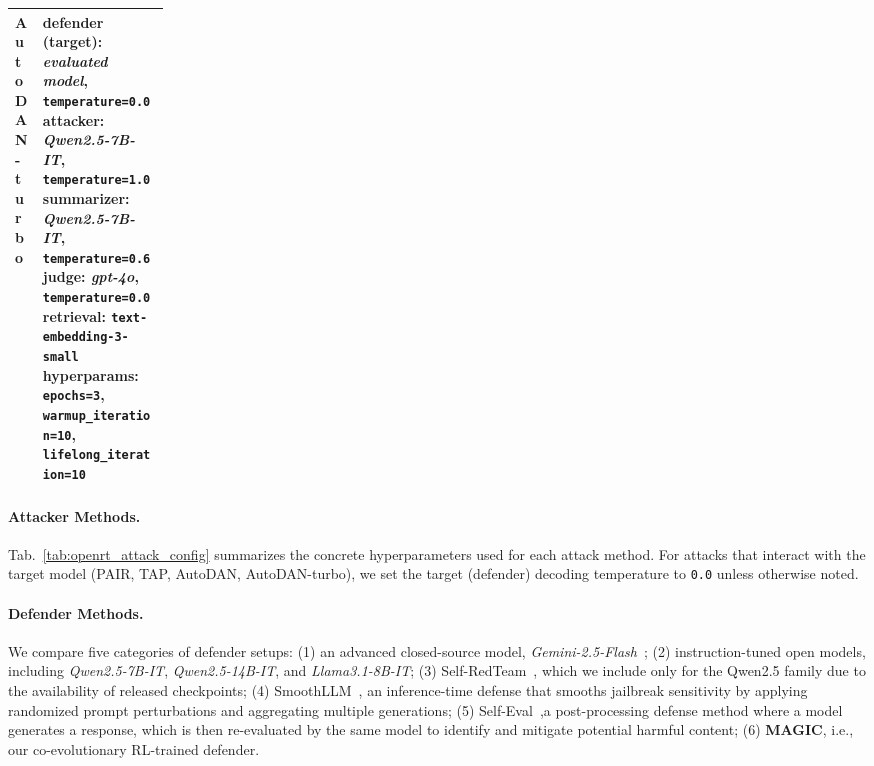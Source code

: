 \documentclass[11pt, letterpaper]{template}
\theoremstyle{plain}
\theoremstyle{definition}
\theoremstyle{remark}
\begin{document}
\begin{table}[t]
\begin{tabularx}{\linewidth}{>{\raggedright\arraybackslash}p{0.18\linewidth} >{\raggedright\arraybackslash}X}
AutoDAN-turbo &
\textbf{defender (target)}: \textit{evaluated model}, \texttt{temperature=0.0}\newline
\textbf{attacker}: \textit{Qwen2.5-7B-IT}, \texttt{temperature=1.0}\newline
\textbf{summarizer}: \textit{Qwen2.5-7B-IT}, \texttt{temperature=0.6}\newline
\textbf{judge}: \textit{gpt-4o}, \texttt{temperature=0.0}\newline
\textbf{retrieval}: \texttt{text-embedding-3-small}\newline
\textbf{hyperparams}: \texttt{epochs=3}, \texttt{warmup\_iteration=10}, \texttt{lifelong\_iteration=10} \\
\bottomrule
\end{tabularx}
\vspace{-1.2em}
\end{table}

\paragraph{Attacker Methods.} Tab.~\ref{tab:openrt_attack_config} summarizes the concrete hyperparameters used for each attack method. For attacks that interact with the target model (PAIR,  TAP, AutoDAN, AutoDAN-turbo), we set the target (defender) decoding temperature to \texttt{0.0} unless otherwise noted.


\paragraph{Defender Methods.} We compare five categories of defender setups: (1) an advanced closed-source model, \textit{Gemini-2.5-Flash}~\citep{comanici2025gemini}; (2) instruction-tuned open models, including \textit{Qwen2.5-7B-IT}, \textit{Qwen2.5-14B-IT}, and \textit{Llama3.1-8B-IT}; (3) Self-RedTeam~\citep{liu2025chasing}, which we include only for the Qwen2.5 family due to the availability of released checkpoints; (4) SmoothLLM~\citep{robey2023smoothllm}, an inference-time defense that smooths jailbreak sensitivity by applying randomized prompt perturbations and aggregating multiple generations; (5) Self-Eval~\citep{phute2023llm},a post-processing defense method where a model generates a response, which is then re-evaluated by the same model to identify and mitigate potential harmful content; (6) \textbf{MAGIC}, i.e., our co-evolutionary RL-trained defender.
\end{document}
